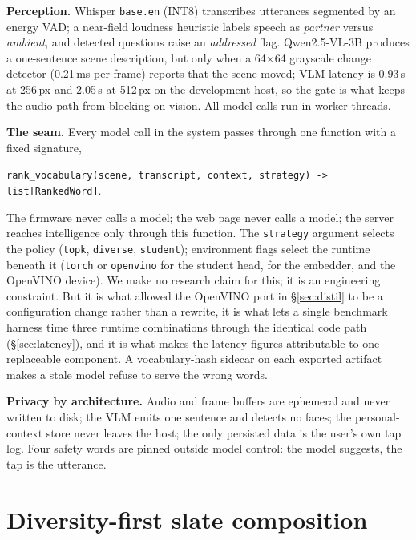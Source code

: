 \documentclass{article}
\newcommand{\fn}[1]{\texttt{#1}}
\begin{document}
\textbf{Perception.} Whisper \fn{base.en} \citep{whisper} (INT8) transcribes utterances
segmented by an energy VAD; a near-field loudness heuristic labels speech as
\emph{partner} versus \emph{ambient}, and detected questions raise an
\emph{addressed} flag. Qwen2.5-VL-3B \citep{qwen25vl} produces a one-sentence
scene description, but only when a 64$\times$64 grayscale change detector
(0.21\,ms per frame) reports that the scene moved; VLM latency is 0.93\,s at 256\,px
and 2.05\,s at 512\,px on the development host, so the gate is what keeps the
audio path from blocking on vision. All model calls run in worker threads.

\textbf{The seam.} Every model call in the system passes through one function
with a fixed signature,
\begin{center}
\fn{rank\_vocabulary(scene, transcript, context, strategy) -> list[RankedWord]}.
\end{center}
The firmware never calls a model; the web page never calls a model; the server
reaches intelligence only through this function. The \fn{strategy} argument
selects the policy (\fn{topk}, \fn{diverse}, \fn{student}); environment flags
select the runtime beneath it (\fn{torch} or \fn{openvino} for the student
head, for the embedder, and the OpenVINO device). We make no research claim for
this; it is an engineering constraint. But it is what allowed the OpenVINO port
in \S\ref{sec:distil} to be a configuration change rather than a rewrite, it is
what lets a single benchmark harness time three runtime combinations through
the identical code path (\S\ref{sec:latency}), and it is what makes the latency
figures attributable to one replaceable component. A vocabulary-hash sidecar on
each exported artifact makes a stale model refuse to serve the wrong words.

\textbf{Privacy by architecture.} Audio and frame buffers are ephemeral and
never written to disk; the VLM emits one sentence and detects no faces; the
personal-context store never leaves the host; the only persisted data is the
user's own tap log. Four safety words are pinned outside model control: the
model suggests, the tap is the utterance.

\section{Diversity-first slate composition}\label{sec:slate}
\end{document}

